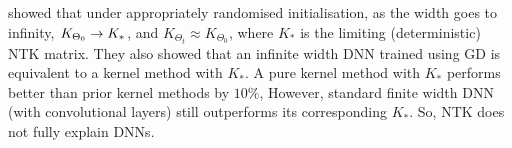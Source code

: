 \cite{arora2019exact} showed that under appropriately randomised initialisation, as the width goes to infinity, $K_{\Theta_0}\rightarrow K_*$, and $K_{\Theta_t}\approx K_{\Theta_0}$, where $K_*$ is the limiting (deterministic) NTK matrix. They also showed that an infinite width DNN trained using GD is equivalent to a kernel method with $K_*$. A pure kernel method with $K_*$ performs better than prior kernel methods by $10\%$, However, standard finite width DNN (with convolutional layers) still outperforms its corresponding $K_*$. So, NTK does not fully explain DNNs.

